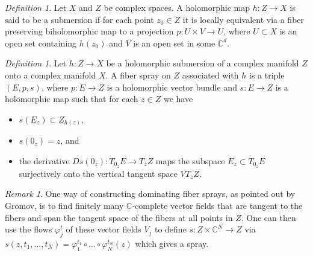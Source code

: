 \documentclass[10pt]{amsart}
\theoremstyle{remark}
\newtheorem{rema}[theo]{Remark}
\newtheorem{defi}[theo]{Definition}
\begin{document}
\begin{defi}
Let $X$ and $Z$ be complex spaces. A holomorphic map $h: Z \to X$ is said to be a submersion if for each point $z_0\in Z$ it is locally equivalent via a fiber preserving biholomorphic map to a projection $p\colon U\times V \to U$, where $U\subset X$ is an open set containing $h(z_0)$ and $V$ is an open set in some $\mathbb{C}^d$.  
\end{defi}




\begin{defi}
Let $h\colon Z \to X$ be a holomorphic submersion of a complex manifold $Z$ onto a complex manifold $X$. A fiber spray on $Z$ associated with $h$ is a triple $(E,p,s)$, where $p\colon E\to Z$ is a holomorphic vector bundle and $s\colon E\to Z$ is a holomorphic map such that for each $z\in Z$ we have 
\begin{itemize}
\item[(i)]{$s(E_z)\subset Z_{h(z)}$,}
\item[(ii)]{$s(0_z)=z$, and}
\item[(iii)]{the derivative $Ds(0_z)\colon T_{0_z}E\to T_zZ$ maps the subspace $E_z\subset T_{0_z}E$ surjectively onto the vertical tangent space $VT_zZ$.}
\end{itemize} 
\end{defi}

\begin{rema} \label{VF-spray}
    One way of constructing dominating fiber sprays, as pointed out by Gromov, is to find finitely many $\mathbb{C}$-complete vector fields that are tangent to the fibers and span the tangent space of the fibers at all points in $Z$. One can then use the flows $\varphi_j^t$ of these vector fields $V_j$ to define $s\colon Z\times \mathbb{C}^N\to Z$ via $s(z,t_1,\dots, t_N)=\varphi_1^{t_1}\circ \dots \circ \varphi_N^{t_N}(z)$ which gives a spray.
\end{rema}
 
\end{document}
